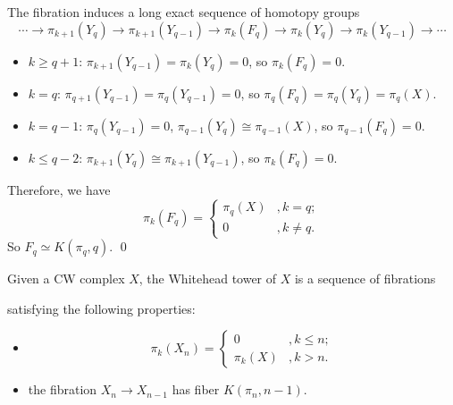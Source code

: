     The fibration induces a long exact sequence of homotopy groups
    \begin{equation*}
        \cdots \to \pi_{k+1}(Y_q) \to \pi_{k+1}(Y_{q-1}) 
        \to \pi_k(F_q) \to \pi_k(Y_q) \to \pi_k(Y_{q-1}) \to \cdots
    \end{equation*}
    \begin{itemize}
        \item $k\geq q+1$: $\pi_{k+1}(Y_{q-1}) = \pi_{k}(Y_q) = 0$,
        so $\pi_k(F_q) = 0$. 
        \item $k=q$: $\pi_{q+1}(Y_{q-1}) = \pi_{q}(Y_{q-1}) = 0$,
        so $\pi_q(F_q) = \pi_q(Y_q) = \pi_q(X)$.
        \item $k=q-1$: $\pi_{q}(Y_{q-1}) = 0$, 
        $\pi_{q-1}(Y_q) \cong \pi_{q-1}(X)$, so $\pi_{q-1}(F_q) = 0$.
        \item $k\leq q-2$: $\pi_{k+1}(Y_{q}) \cong \pi_{k+1}(Y_{q-1})$,
        so $\pi_k(F_q) = 0$.
    \end{itemize}
    Therefore, we have
    \begin{equation*}
        \pi_k(F_q) = 
        \begin{cases}
            \pi_q(X) &, k=q; \\
            0 &, k\neq q.
        \end{cases}
    \end{equation*}
    So $F_q\simeq K(\pi_q,q)$. 
    \qed

    \begin{definition}
        Given a CW complex $X$, the Whitehead tower of $X$ is a sequence
        of fibrations
        \begin{center}
        \end{center}
        satisfying the following properties:
        \begin{itemize}
            \item 
            \begin{equation*}
                \pi_k(X_n) = 
                \begin{cases}
                    0 &, k\leq n; \\
                    \pi_k(X) &, k>n.
                \end{cases}
            \end{equation*}
            \item the fibration $X_n\to X_{n-1}$ has fiber $K(\pi_n,n-1)$.
        \end{itemize}
    \end{definition}

